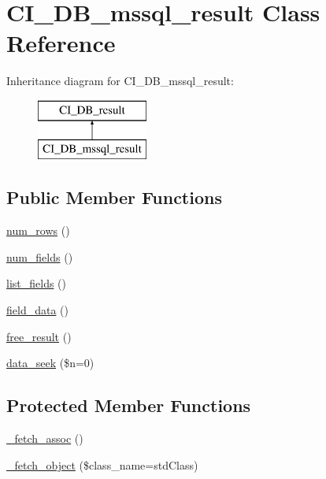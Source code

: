 \hypertarget{class_c_i___d_b__mssql__result}{}\section{C\+I\+\_\+\+D\+B\+\_\+mssql\+\_\+result Class Reference}
\label{class_c_i___d_b__mssql__result}
Inheritance diagram for C\+I\+\_\+\+D\+B\+\_\+mssql\+\_\+result\+:\begin{figure}[H]
\begin{center}
\leavevmode
\includegraphics[height=2.000000cm]{class_c_i___d_b__mssql__result}
\end{center}
\end{figure}
\subsection*{Public Member Functions}
\begin{DoxyCompactItemize}
\item 
\mbox{\hyperlink{class_c_i___d_b__mssql__result_a218657c303ee499b97710ab0cd2f5d6e}{num\+\_\+rows}} ()
\item 
\mbox{\hyperlink{class_c_i___d_b__mssql__result_af831bf363e4d7d661a717a4932af449d}{num\+\_\+fields}} ()
\item 
\mbox{\hyperlink{class_c_i___d_b__mssql__result_a50b54eb4ea7cfd039740f532988ea776}{list\+\_\+fields}} ()
\item 
\mbox{\hyperlink{class_c_i___d_b__mssql__result_a84bffd65e53902ade1591716749a33e3}{field\+\_\+data}} ()
\item 
\mbox{\hyperlink{class_c_i___d_b__mssql__result_aad2d98d6beb3d6095405356c6107b473}{free\+\_\+result}} ()
\item 
\mbox{\hyperlink{class_c_i___d_b__mssql__result_a8255ae91816e4206e29eb7581c5af0f1}{data\+\_\+seek}} (\$n=0)
\end{DoxyCompactItemize}
\subsection*{Protected Member Functions}
\begin{DoxyCompactItemize}
\item 
\mbox{\hyperlink{class_c_i___d_b__mssql__result_a43a9a92817f1334a1c10752ec44275a0}{\+\_\+fetch\+\_\+assoc}} ()
\item 
\mbox{\hyperlink{class_c_i___d_b__mssql__result_a60806be6a9c2488820813c2a7f4fef71}{\+\_\+fetch\+\_\+object}} (\$class\+\_\+name=\textquotesingle{}std\+Class\textquotesingle{})
\end{DoxyCompactItemize}
